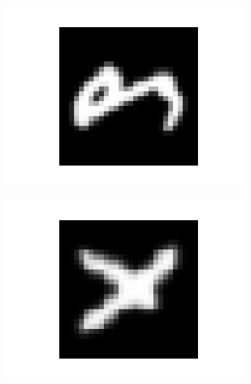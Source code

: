 \documentclass[14pt,a4paper]{extarticle}
\begin{document}
\begin{figure}[htb]
\begin{subfigure}[b]{0.3\textwidth}
    \includegraphics[width=\textwidth]{../res/emnist/sample_4.png}
    \label{fig:emnist_sample_4}
  \end{subfigure}
  \hfill
  \begin{subfigure}[b]{0.3\textwidth}
    \includegraphics[width=\textwidth]{../res/emnist/sample_5.png}
    \label{fig:emnist_sample_5}
  \end{subfigure}
  \hfill
  \begin{subfigure}[b]{0.3\textwidth}

\end{subfigure}
\end{figure}
\end{document}
